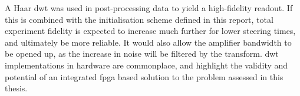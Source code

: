 A Haar \gls{dwt} was used in post-processing data to yield a high-fidelity readout. If this is combined with the initialisation scheme defined in this report, total experiment fidelity is expected to increase much further for lower steering times, and ultimately be more reliable. It would also allow the amplifier bandwidth to be opened up, as the increase in noise will be filtered by the transform. \gls{dwt} implementations in hardware \cite{PeiYinChen2004,hsieh2006novel,Salama2006} are commonplace, and highlight the validity and potential of an integrated \gls{fpga} based solution to the problem assessed in this thesis. 



